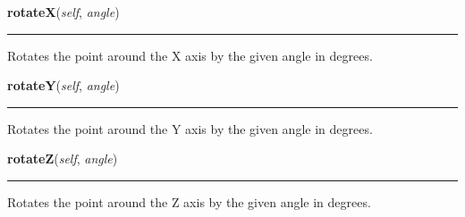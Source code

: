     \label{polygon:Point3D:rotateX}

    \vspace{0.5ex}

\hspace{.8\funcindent}\begin{boxedminipage}{\funcwidth}

    \raggedright \textbf{rotateX}(\textit{self}, \textit{angle})

    \vspace{-1.5ex}

    \rule{\textwidth}{0.5\fboxrule}
\setlength{\parskip}{2ex}
    Rotates the point around the X axis by the given angle in degrees.

\setlength{\parskip}{1ex}
    \end{boxedminipage}

    \label{polygon:Point3D:rotateY}

    \vspace{0.5ex}

\hspace{.8\funcindent}\begin{boxedminipage}{\funcwidth}

    \raggedright \textbf{rotateY}(\textit{self}, \textit{angle})

    \vspace{-1.5ex}

    \rule{\textwidth}{0.5\fboxrule}
\setlength{\parskip}{2ex}
    Rotates the point around the Y axis by the given angle in degrees.

\setlength{\parskip}{1ex}
    \end{boxedminipage}

    \label{polygon:Point3D:rotateZ}

    \vspace{0.5ex}

\hspace{.8\funcindent}\begin{boxedminipage}{\funcwidth}

    \raggedright \textbf{rotateZ}(\textit{self}, \textit{angle})

    \vspace{-1.5ex}

    \rule{\textwidth}{0.5\fboxrule}
\setlength{\parskip}{2ex}
    Rotates the point around the Z axis by the given angle in degrees.

\setlength{\parskip}{1ex}
    \end{boxedminipage}

